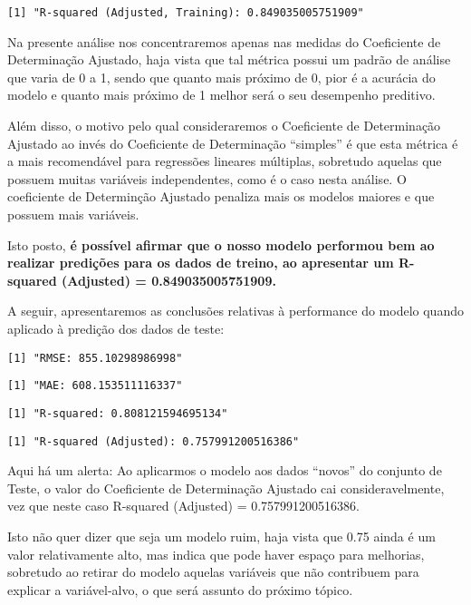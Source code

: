 \documentclass[
  letterpaper,
  DIV=11,
  numbers=noendperiod]{scrartcl}
\begin{document}
\begin{verbatim}
[1] "R-squared (Adjusted, Training): 0.849035005751909"
\end{verbatim}

Na presente análise nos concentraremos apenas nas medidas do Coeficiente
de Determinação Ajustado, haja vista que tal métrica possui um padrão de
análise que varia de 0 a 1, sendo que quanto mais próximo de 0, pior é a
acurácia do modelo e quanto mais próximo de 1 melhor será o seu
desempenho preditivo.

Além disso, o motivo pelo qual consideraremos o Coeficiente de
Determinação Ajustado ao invés do Coeficiente de Determinação
``simples'' é que esta métrica é a mais recomendável para regressões
lineares múltiplas, sobretudo aquelas que possuem muitas variáveis
independentes, como é o caso nesta análise. O coeficiente de Determinção
Ajustado penaliza mais os modelos maiores e que possuem mais variáveis.

Isto posto, \textbf{é possível afirmar que o nosso modelo performou bem
ao realizar predições para os dados de treino, ao apresentar um
R-squared (Adjusted) = 0.849035005751909.}

A seguir, apresentaremos as conclusões relativas à performance do modelo
quando aplicado à predição dos dados de teste:

\begin{verbatim}
[1] "RMSE: 855.10298986998"
\end{verbatim}

\begin{verbatim}
[1] "MAE: 608.153511116337"
\end{verbatim}

\begin{verbatim}
[1] "R-squared: 0.808121594695134"
\end{verbatim}

\begin{verbatim}
[1] "R-squared (Adjusted): 0.757991200516386"
\end{verbatim}

Aqui há um alerta: Ao aplicarmos o modelo aos dados ``novos'' do
conjunto de Teste, o valor do Coeficiente de Determinação Ajustado cai
consideravelmente, vez que neste caso R-squared (Adjusted) =
0.757991200516386.

Isto não quer dizer que seja um modelo ruim, haja vista que 0.75 ainda é
um valor relativamente alto, mas indica que pode haver espaço para
melhorias, sobretudo ao retirar do modelo aquelas variáveis que não
contribuem para explicar a variável-alvo, o que será assunto do próximo
tópico.
\end{document}
